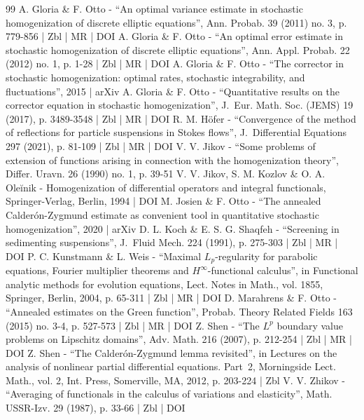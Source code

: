 \documentclass[10pt]{amsart}
\theoremstyle{plain}
\theoremstyle{definition}
\begin{document}
\begin{thebibliography}{99}
A. Gloria \& F. Otto - “An optimal variance estimate in stochastic homogenization of discrete elliptic equations”, Ann. Probab. 39 (2011) no. 3, p. 779-856 | Zbl | MR | DOI
A. Gloria \& F. Otto - “An optimal error estimate in stochastic homogenization of discrete elliptic equations”, Ann. Appl. Probab. 22 (2012) no. 1, p. 1-28 | Zbl | MR | DOI
A. Gloria \& F. Otto - “The corrector in stochastic homogenization: optimal rates, stochastic integrability, and fluctuations”, 2015 | arXiv
A. Gloria \& F. Otto - “Quantitative results on the corrector equation in stochastic homogenization”, J. Eur. Math. Soc. (JEMS) 19 (2017), p. 3489-3548 | Zbl | MR | DOI
R. M. Höfer - “Convergence of the method of reflections for particle suspensions in Stokes flows”, J. Differential Equations 297 (2021), p. 81-109 | Zbl | MR | DOI
V. V. Jikov - “Some problems of extension of functions arising in connection with the homogenization theory”, Differ. Uravn. 26 (1990) no. 1, p. 39-51
V. V. Jikov, S. M. Kozlov \& O. A. Oleĭnik - Homogenization of differential operators and integral functionals, Springer-Verlag, Berlin, 1994 | DOI
M. Josien \& F. Otto - “The annealed Calderón-Zygmund estimate as convenient tool in quantitative stochastic homogenization”, 2020 | arXiv
D. L. Koch \& E. S. G. Shaqfeh - “Screening in sedimenting suspensions”, J. Fluid Mech. 224 (1991), p. 275-303 | Zbl | MR | DOI
P. C. Kunstmann \& L. Weis - “Maximal $L_p$-regularity for parabolic equations, Fourier multiplier theorems and $H^\infty $-functional calculus”, in Functional analytic methods for evolution equations, Lect. Notes in Math., vol. 1855, Springer, Berlin, 2004, p. 65-311 | Zbl | MR | DOI
D. Marahrens \& F. Otto - “Annealed estimates on the Green function”, Probab. Theory Related Fields 163 (2015) no. 3-4, p. 527-573 | Zbl | MR | DOI
Z. Shen - “The $L^p$ boundary value problems on Lipschitz domains”, Adv. Math. 216 (2007), p. 212-254 | Zbl | MR | DOI
Z. Shen - “The Calderón-Zygmund lemma revisited”, in Lectures on the analysis of nonlinear partial differential equations. Part 2, Morningside Lect. Math., vol. 2, Int. Press, Somerville, MA, 2012, p. 203-224 | Zbl
V. V. Zhikov - “Averaging of functionals in the calculus of variations and elasticity”, Math. USSR-Izv. 29 (1987), p. 33-66 | Zbl | DOI
\end{thebibliography}
\end{document}
